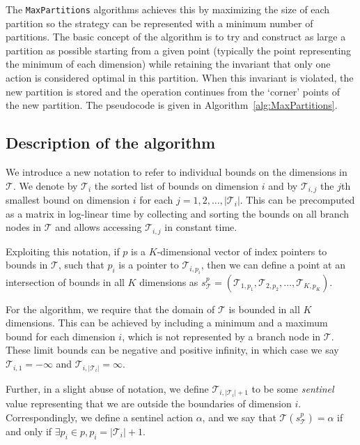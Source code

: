The \texttt{MaxPartitions} algorithms achieves this by maximizing the size of
each partition so the strategy can be represented with a minimum number of
partitions. The basic concept of the algorithm is to try and construct as large
a partition as possible starting from a given point (typically the point
representing the minimum of each dimension) while retaining the invariant that
only one action is considered optimal in this partition. When this invariant is
violated, the new partition is stored and the operation continues from the
`corner' points of the new partition.  The pseudocode is given in
Algorithm~\ref{alg:MaxPartitions}.

\subsection{Description of the algorithm}%
\label{sub:maxPartsDescription}

We introduce a new notation to refer to individual bounds on the dimensions in
$\mathcal{T}$. We denote by $\mathcal{T}_i$ the sorted list of bounds on
dimension $i$ and by $\mathcal{T}_{i,j}$ the $j$th smallest bound on dimension
$i$ for each $j = 1,2,\ldots,|\mathcal{T}_i|$. This can be precomputed as a
matrix in log-linear time by collecting and sorting the bounds on all branch
nodes in $\mathcal{T}$ and allows accessing $\mathcal{T}_{i,j}$ in constant
time.

Exploiting this notation, if $p$ is a $K$-dimensional vector of index pointers
to bounds in $\mathcal{T}$, such that $p_i$ is a pointer to
$\mathcal{T}_{i,p_i}$, then we can define a point at an intersection of bounds
in all $K$ dimensions as $s^{p}_{\mathcal{T}} =
(\mathcal{T}_{1,p_1},\mathcal{T}_{2,p_2},\ldots,\mathcal{T}_{K,p_K})$.

For the algorithm, we require that the domain of $\mathcal{T}$ is bounded in all
$K$ dimensions. This can be achieved by including a minimum and a maximum bound
for each dimension $i$, which is not represented by a branch node in
$\mathcal{T}$. These limit bounds can be negative and positive infinity, in
which case we say $\mathcal{T}_{i,1} = -\infty$ and
$\mathcal{T}_{i,|\mathcal{T}_{i}|} = \infty$.

Further, in a slight abuse of notation, we define
$\mathcal{T}_{i,|\mathcal{T}_i| + 1}$ to be some \textit{sentinel} value
representing that we are outside the boundaries of dimension $i$.
Correspondingly, we define a sentinel action $\alpha$, and we say that
$\mathcal{T}(s^p_{\mathcal{T}}) = \alpha$ if and only if $\exists p_i \in p, p_i
= |\mathcal{T}_i| + 1$.


